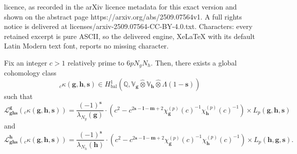 \documentclass[10pt,a4paper]{amsart}
\DeclareMathOperator{\bal}{bal}
\newcommand{\cl}{\mathcal}
\newcommand{\hg}{{\mathbf{g}}}
\newcommand{\hh}{{\mathbf h}}
\newcommand{\res}{\mathrm{res}}
\begin{document}
licence, as recorded in the arXiv licence metadata for this exact version and shown on the abstract page https://arxiv.org/abs/2509.07564v1. A full rights notice is delivered at licenses/arxiv-2509.07564-CC-BY-4.0.txt. Characters: every retained excerpt is pure ASCII, so the delivered engine, XeLaTeX with its default Latin Modern text font, reports no missing character.
\begin{theorem}\label{reclaw}
Fix an integer $c>1$ relatively prime to $6pN_gN_h$. Then, there exists a global cohomology class \[ _c\kappa(\hg,\hh,\mathbf{s}) \in H^1_{\bal}(\mathbb Q, \mathbb V_{\hg} \hat \otimes \mathbb V_{\hh} \hat \otimes \Lambda(1-\mathbf{s})) \] such that
\[
\cl{L}_{\hg\hh\mathbf{s}}^{\hg}(_c\kappa(\hg,\hh,\mathbf{s}))=\frac{(-1)^{\mathbf{s}}}{\lambda_{N_g}(\hg)} \cdot (c^2-c^{2\mathbf{s}-\mathbf{l}-\mathbf{m}+2}\chi_{\hg}^{(p)}(c)^{-1}\chi_{\hh}^{(p)}(c)^{-1}) \times L_p(\hg,\hh,\mathbf{s})
\]
and
\[
\cl{L}_{\hg\hh\mathbf{s}}^{\hh}(_c\kappa(\hg,\hh,\mathbf{s}))=\frac{(-1)^{\mathbf{s}}}{\lambda_{N_h}(\hh)} \cdot (c^2-c^{2\mathbf{s}-\mathbf{l}-\mathbf{m}+2}\chi_{\hg}^{(p)}(c)^{-1}\chi_{\hh}^{(p)}(c)^{-1}) \times L_p(\hh,\hg,\mathbf{s}).
\]
\end{theorem}
\end{document}
